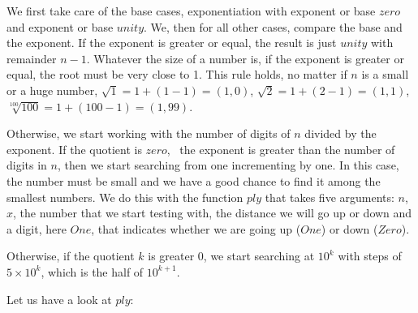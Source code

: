 \documentclass{scrreprt}
\newcommand{\Conid}[1]{\mathit{#1}}
\newcommand{\Varid}[1]{\mathit{#1}}
\def\resethooks{%
  \global\let\SaveRestoreHook\empty
  \global\let\ColumnHook\empty}
\begin{document}
\)\par\noindent\endgroup\resethooks

We first take care of the base cases,
exponentiation with exponent or base \ensuremath{\Varid{zero}}
and exponent or base \ensuremath{\Varid{unity}}.
We, then for all other cases,
compare the base and the exponent.
If the exponent is greater or equal,
the result is just \ensuremath{\Varid{unity}} with remainder $n - 1$.
Whatever the size of a number is,
if the exponent is greater or equal,
the root must be very close to 1.
This rule holds, no matter if \ensuremath{\Varid{n}} is a small
or a huge number, \eg\:
$\sqrt{1} = 1 + (1-1) = (1,0)$,
$\sqrt{2} = 1 + (2-1) = (1,1)$,
$\sqrt[100]{100} = 1 + (100-1) = (1,99)$.

Otherwise, we start working with the number of digits
of \ensuremath{\Varid{n}} divided by the exponent.
If the quotient is \ensuremath{\Varid{zero}}, \ie\ the exponent is greater
than the number of digits in \ensuremath{\Varid{n}},
then we start searching from one
incrementing by one.
In this case, the number must be small
and we have a good chance to find it 
among the smallest numbers.
We do this with the function \ensuremath{\Varid{ply}}
that takes five arguments:
$n$, $x$, 
the number that we start testing with,
the distance we will go up or down
and a digit, here \ensuremath{\Conid{One}}, that indicates
whether we are going up (\ensuremath{\Conid{One}}) or down (\ensuremath{\Conid{Zero}}).

Otherwise, if the quotient $k$ is greater 0, 
we start searching at $10^k$
with steps of $5  \times 10^k$,
which is the half of $10^{k+1}$.

Let us have a look at \ensuremath{\Varid{ply}}:
\end{document}
